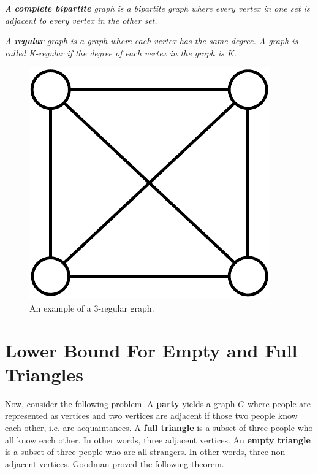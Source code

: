 \documentclass[10pt]{amsart}
\begin{document}
 \emph{A \textbf{complete bipartite} graph is a bipartite graph where every 
vertex in one set is adjacent to every vertex in the other set.}

 \emph{A \textbf{regular} graph is a graph where each vertex has the same 
degree. A graph is called K-regular if the degree of each vertex in the graph is K.}
\begin{figure}[h!]
    \centering
    \includegraphics[scale=.4]{../figures/regular_graph.pdf}
    \caption{An example of a 3-regular graph.}
\end{figure}




\section{Lower Bound For Empty and Full Triangles}

Now, consider the following problem.
A \textbf{party} yields a graph $G$ where people are represented as vertices and two vertices are 
adjacent if those two people know each other, i.e. are acquaintances.
A \textbf{full triangle} is a subset of three people who all know each other. In other words, three 
adjacent vertices.
An \textbf{empty triangle} is a subset of three people who are all strangers. In other words, three
non-adjacent vertices. Goodman \cite{AG} proved the following theorem.
\end{document}
